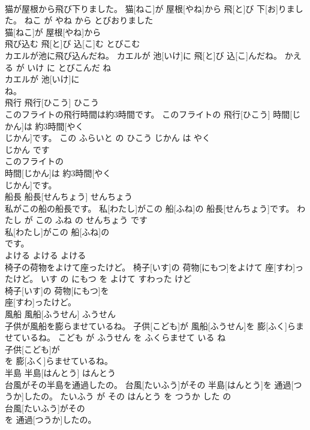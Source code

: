 \documentclass[8pt]{extreport}
\begin{document}
\begin{CJK}{UTF8}{min}
\\	猫が屋根から飛び下りました。	猫[ねこ]が 屋根[やね]から 飛[と]び 下[お]りました。	ねこ が やね から とびおりました	
\\	猫[ねこ]が 屋根[やね]から
\\	飛び込む	飛[と]び 込[こ]む	とびこむ	
\\	カエルが池に飛び込んだね。	カエルが 池[いけ]に 飛[と]び 込[こ]んだね。	かえる が いけ に とびこんだ ね	
\\	カエルが 池[いけ]に
\\	ね。			
\\	飛行	飛行[ひこう]	ひこう	
\\	このフライトの飛行時間は約3時間です。	このフライトの 飛行[ひこう] 時間[じかん]は 約3時間[やく 
\\	じかん]です。	この ふらいと の ひこう じかん は やく 
\\	じかん です	
\\	このフライトの
\\	時間[じかん]は 約3時間[やく 
\\	じかん]です。			
\\	船長	船長[せんちょう]	せんちょう	
\\	私がこの船の船長です。	私[わたし]がこの 船[ふね]の 船長[せんちょう]です。	わたし が この ふね の せんちょう です	
\\	私[わたし]がこの 船[ふね]の
\\	です。			
\\	よける	よける	よける	
\\	椅子の荷物をよけて座ったけど。	椅子[いす]の 荷物[にもつ]をよけて 座[すわ]ったけど。	いす の にもつ を よけて すわった けど	
\\	椅子[いす]の 荷物[にもつ]を
\\	座[すわ]ったけど。			
\\	風船	風船[ふうせん]	ふうせん	
\\	子供が風船を膨らませているね。	子供[こども]が 風船[ふうせん]を 膨[ふく]らませているね。	こども が ふうせん を ふくらませて いる ね	
\\	子供[こども]が
\\	を 膨[ふく]らませているね。			
\\	半島	半島[はんとう]	はんとう	
\\	台風がその半島を通過したの。	台風[たいふう]がその 半島[はんとう]を 通過[つうか]したの。	たいふう が その はんとう を つうか した の	
\\	台風[たいふう]がその
\\	を 通過[つうか]したの。			

\end{CJK}
\end{document}
